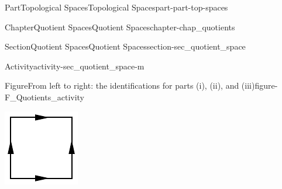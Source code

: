 \documentclass[oneside,10pt,]{book}
\numberwithin{equation}{chapter}
\begin{document}
\begin{partptx}{Part}{Topological Spaces}{}{Topological Spaces}{}{}{part-part-top-spaces}
\begin{chapterptx}{Chapter}{Quotient Spaces}{}{Quotient Spaces}{}{}{chapter-chap_quotients}
\begin{sectionptx}{Section}{Quotient Spaces}{}{Quotient Spaces}{}{}{section-sec_quotient_space}
\begin{activity}{Activity}{}{activity-sec_quotient_space-m}
\begin{enumerate}[font=\bfseries,label=(\alph*),ref=\alph*]
\begin{figureptx}{Figure}{From left to right: the identifications for parts (i), (ii), and (iii)}{figure-F_Quotients_activity}{}
\begin{sidebyside}{3}{0}{0}{0}
\begin{sbspanel}{0.333333333333333}
\includegraphics[width=\linewidth]{external/Torus_identification.pdf}
\end{sbspanel}%
\begin{sbspanel}{0.333333333333333}%

\end{sbspanel}
\end{sidebyside}
\end{figureptx}
\end{enumerate}
\end{activity}
\end{sectionptx}
\end{chapterptx}
\end{partptx}
\end{document}
